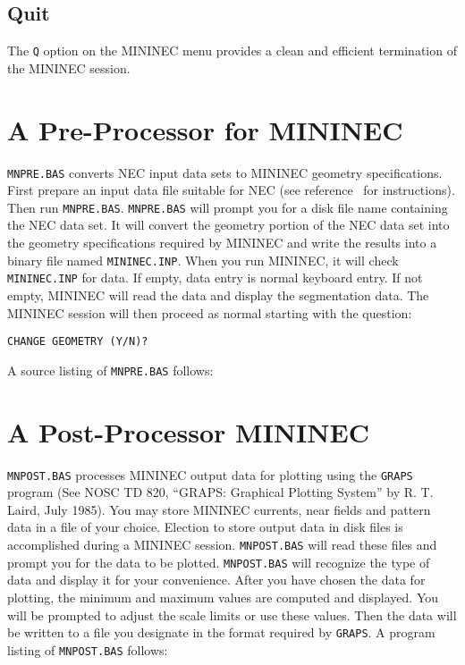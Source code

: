 \documentclass[12pt]{article}
\begin{document}
\subsection{Quit}
The \verb+Q+ option on the MININEC menu provides a clean and efficient
termination of the MININEC session.

\appendix
\section{A Pre-Processor for MININEC}
\verb+MNPRE.BAS+ converts NEC input data sets to MININEC geometry
specifications. First prepare an input data file suitable for NEC (see
reference~\cite{r5} for instructions). Then run \verb+MNPRE.BAS+.
\verb+MNPRE.BAS+ will prompt you for a disk file name containing the NEC
data set. It will convert the geometry portion of the NEC data set into
the geometry specifications required by MININEC and write the results
into a binary file named \verb+MININEC.INP+. When you run MININEC, it
will check \verb+MININEC.INP+ for data. If empty, data entry is normal
keyboard entry. If not empty, MININEC will read the data and display the
segmentation data. The MININEC session will then proceed as normal
starting with the question:

\begin{Verbatim}
CHANGE GEOMETRY (Y/N)?
\end{Verbatim}

A source listing of \verb+MNPRE.BAS+ follows:

\section{A Post-Processor MININEC}
\verb+MNPOST.BAS+ processes MININEC output data for plotting using the
\verb+GRAPS+ program (See NOSC TD 820, ``GRAPS: Graphical Plotting
System'' by R. T. Laird, July 1985). You may store MININEC currents,
near fields and pattern data in a file of your choice. Election to store
output data in disk files is accomplished during a MININEC session.
\verb+MNPOST.BAS+ will read these files and prompt you for the data to
be plotted. \verb+MNPOST.BAS+ will recognize the type of data and
display it for your convenience. After you have chosen the data for
plotting, the minimum and maximum values are computed and displayed. You
will be prompted to adjust the scale limits or use these values. Then
the data will be written to a file you designate in the format required
by \verb+GRAPS+. A program listing of \verb+MNPOST.BAS+ follows:
\end{document}
